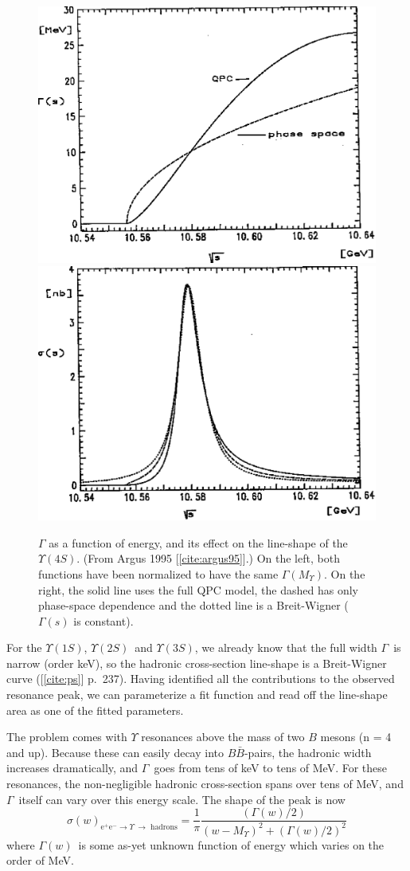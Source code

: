 \documentclass[12pt]{article}
\def\yis{$\Upsilon(1S)$}
\def\yiis{$\Upsilon(2S)$}
\def\yiiis{$\Upsilon(3S)$}
\def\yivs{$\Upsilon(4S)$}
\def\gamtot{$\Gamma$}
\def\gamofw{$\Gamma(w)$}
\def\bbar{$B\bar{B}$}
\begin{document}
\begin{figure}[p]
  \begin{center}
    \includegraphics[width=0.45\linewidth]{gamma_from_models.eps}
    \includegraphics[width=0.45\linewidth]{peak_from_models.eps}
  \end{center}

  \caption{$\Gamma$ as a function of energy, and its effect on the
  line-shape of the \yivs. (From {\sc Argus} 1995 [\ref{cite:argus95}].) On
  the left, both functions have been normalized to have the same
  $\Gamma(\mbox{$M_\Upsilon$})$. On the right, the solid line uses
  the full QPC model, the dashed has only phase-space dependence and
  the dotted line is a Breit-Wigner ($\Gamma(s)$ is constant).}

  \label{fig:models}
\end{figure}

For the \yis, \yiis\ and \yiiis, we already know that the full width
\gamtot\ is narrow (order keV), so the hadronic cross-section
line-shape is a Breit-Wigner curve ([\ref{cite:ps}] p.\ 237). Having
identified all the contributions to the observed resonance peak, we
can parameterize a fit function and read off the line-shape area as
one of the fitted parameters.

The problem comes with $\Upsilon$ resonances above the mass of two $B$
mesons (n = 4 and up). Because these can easily decay into
\bbar-pairs, the hadronic width increases dramatically, and
\gamtot\ goes from tens of keV to tens of MeV. For these resonances,
the non-negligible hadronic cross-section spans over tens of MeV, and
\gamtot\ itself can vary over this energy scale. The shape of the peak
is now
\begin{equation}
  \sigma(w)_{\mbox{e$^+$e$^-$} \to \Upsilon\ \to \mbox{ hadrons}} =
  \frac{1}{\pi} \frac{\left(\Gamma(w)/2\right)
                     }{\left(w-\mbox{$M_\Upsilon$}\right)^2 + \left(\Gamma(w)/2\right)^2}
\end{equation}
where \gamofw\ is some as-yet unknown function of energy which
varies on the order of MeV.
\end{document}

